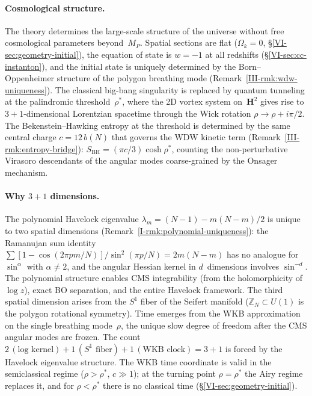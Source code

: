 \paragraph{Cosmological structure.}
The theory determines the large-scale structure of the
universe without free cosmological parameters beyond~$M_P$.
Spatial sections are flat
($\Omega_k = 0$, \S\ref{VI-sec:geometry-initial}),
the equation of state is $w = -1$ at all redshifts
(\S\ref{VI-sec:cc-instanton}),
and the initial state is uniquely determined by the
Born--Oppenheimer structure of the polygon breathing mode
(Remark~\ref{III-rmk:wdw-uniqueness}).
The classical big-bang singularity is replaced by quantum
tunneling at the palindromic threshold~$\rho^*$, where
the 2D vortex system on~$\mathbf{H}^2$ gives rise to
$3{+}1$-dimensional Lorentzian spacetime through the
Wick rotation $\rho \to \rho + i\pi/2$.
The Bekenstein--Hawking entropy at the threshold
is determined by the same central charge
$c = 12\,b(N)$ that governs the WDW kinetic term
(Remark~\ref{III-rmk:entropy-bridge}):
$S_{\mathrm{BH}} = (\pi c/3)\cosh\rho^*$, counting the
non-perturbative Virasoro descendants of the angular modes
coarse-grained by the Onsager mechanism.

\paragraph{Why $3{+}1$ dimensions.}
The polynomial Havelock eigenvalue $\lambda_m = (N{-}1) - m(N{-}m)/2$
is unique to two spatial dimensions
(Remark~\ref{I-rmk:polynomial-uniqueness}):
the Ramanujan sum identity
$\sum[1{-}\cos(2\pi pm/N)]/\sin^2(\pi p/N) = 2m(N{-}m)$
has no analogue for $\sin^\alpha$ with $\alpha \ne 2$,
and the angular Hessian kernel in $d$~dimensions
involves $\sin^{-d}$.
The polynomial structure enables CMS integrability
(from the holomorphicity of $\log z$), exact BO
separation, and the entire Havelock framework.
The third spatial dimension arises from the $S^1$ fiber
of the Seifert manifold ($\mathbb{Z}_N \subset U(1)$
is the polygon rotational symmetry).
Time emerges from the WKB approximation on the single
breathing mode~$\rho$, the unique slow degree of
freedom after the CMS angular modes are frozen.
The count $2\,(\text{log kernel}) + 1\,(S^1\text{ fiber})
+ 1\,(\text{WKB clock}) = 3{+}1$ is forced by
the Havelock eigenvalue structure.
The WKB time coordinate is valid in the semiclassical
regime ($\rho > \rho^*$, $c \gg 1$); at the turning
point $\rho = \rho^*$ the Airy regime replaces it,
and for $\rho < \rho^*$ there is no classical time
(\S\ref{VI-sec:geometry-initial}).

